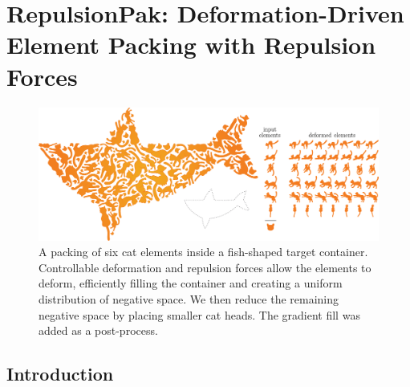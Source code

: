 
\newcommand{\simforce}[1]{\bm{F}_{\kern -0.02in #1}}

\chapter[RepulsionPak: Deformation-Driven Element Packing \newline with Repulsion Forces]
{RepulsionPak: Deformation-Driven Element Packing with Repulsion Forces}
\label{chapter_repulsionpak}

\begin{figure}[h!]
  \centering
  \includegraphics[width=1.0\textwidth]{figures/repulsionpak/cat_whale_04}
  \caption[A packing of a cat]
  {
  \label{cat_packing}
           A packing of six cat elements inside a fish-shaped target container. 
           Controllable deformation and repulsion forces allow the elements to deform,
           efficiently filling the container and creating a uniform distribution of
           negative space. We then reduce the remaining negative space by placing smaller
           cat heads. The gradient fill was added as a post-process.}
\end{figure}



\section{Introduction}
\label{repulsionpak_introduction}



